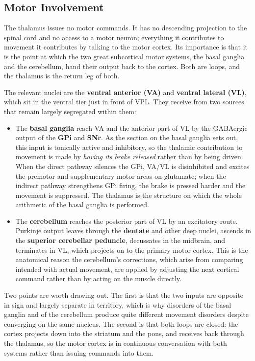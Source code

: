 \documentclass[11pt]{article}
\begin{document}
\subsection{Motor Involvement}

The thalamus issues no motor commands. It has no descending projection to the spinal cord and no access to a motor neuron; everything it contributes to movement it contributes by talking to the motor cortex. Its importance is that it is the point at which the two great subcortical motor systems, the basal ganglia and the cerebellum, hand their output back to the cortex. Both are loops, and the thalamus is the return leg of both.

The relevant nuclei are the \textbf{ventral anterior (VA)} and \textbf{ventral lateral (VL)}, which sit in the ventral tier just in front of VPL. They receive from two sources that remain largely segregated within them:

\begin{itemize}
    \item The \textbf{basal ganglia} reach VA and the anterior part of VL by the GABAergic output of the \textbf{GPi} and \textbf{SNr}. As the section on the basal ganglia sets out, this input is tonically active and inhibitory, so the thalamic contribution to movement is made by \textit{having its brake released} rather than by being driven. When the direct pathway silences the GPi, VA/VL is disinhibited and excites the premotor and supplementary motor areas on glutamate; when the indirect pathway strengthens GPi firing, the brake is pressed harder and the movement is suppressed. The thalamus is the structure on which the whole arithmetic of the basal ganglia is performed.
    \item The \textbf{cerebellum} reaches the posterior part of VL by an excitatory route. Purkinje output leaves through the \textbf{dentate} and other deep nuclei, ascends in the \textbf{superior cerebellar peduncle}, decussates in the midbrain, and terminates in VL, which projects on to the primary motor cortex. This is the anatomical reason the cerebellum's corrections, which arise from comparing intended with actual movement, are applied by adjusting the next cortical command rather than by acting on the muscle directly.
\end{itemize}

Two points are worth drawing out. The first is that the two inputs are opposite in sign and largely separate in territory, which is why disorders of the basal ganglia and of the cerebellum produce quite different movement disorders despite converging on the same nucleus. The second is that both loops are closed: the cortex projects down into the striatum and the pons, and receives back through the thalamus, so the motor cortex is in continuous conversation with both systems rather than issuing commands into them.
\end{document}
